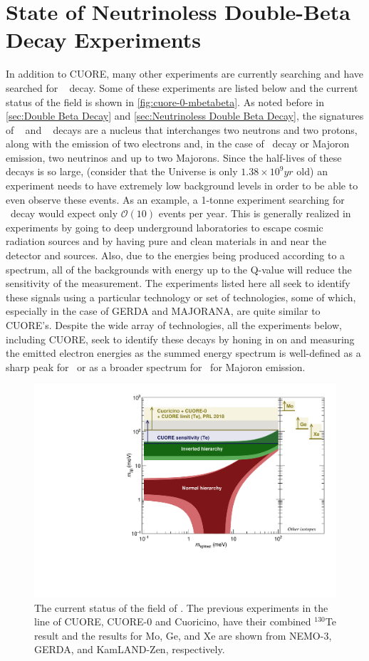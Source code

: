 \section{State of Neutrinoless Double-Beta Decay Experiments}
\label{sec:State of Neutrinoless Double Beta Decay Experiments}
In addition to CUORE, many other experiments are currently searching and have searched for \zeronubb~ decay. Some of these experiments are listed below and the current status of the field is shown in \autoref{fig:cuore-0-mbetabeta}. As noted before in \autoref{sec:Double Beta Decay} and \autoref{sec:Neutrinoless Double Beta Decay}, the signatures of \zeronubb~ and \twonubb~ decays are a nucleus that interchanges two neutrons and two protons, along with the emission of two electrons and, in the case of \twonubb~decay or Majoron emission, two neutrinos and up to two Majorons. Since the half-lives of these decays is so large, (consider that the Universe is only $1.38\times10^{9} yr$ old) an experiment needs to have extremely low background levels in order to be able to even observe these events. As an example, a 1-tonne experiment searching for \zeronubb~decay would expect only $\mathcal{O}(10)$ events per year.  This is generally realized in experiments by going to deep underground laboratories to escape cosmic radiation sources and by having pure and clean materials in and near the detector and sources. Also, due to the energies being produced according to a spectrum, all of the backgrounds with energy up to the Q-value will reduce the sensitivity of the measurement. The experiments listed here all seek to identify these signals using a particular technology or set of technologies, some of which, especially in the case of GERDA and MAJORANA, are quite similar to CUORE's. Despite the wide array of technologies, all the experiments below, including CUORE, seek to identify these decays by honing in on and measuring the emitted electron energies as the summed energy spectrum is well-defined as a sharp peak for \zeronubb~or as a broader spectrum for \twonubb~for Majoron emission.


\begin{figure}[htbp]
\centering
\includegraphics[width=0.7\linewidth]{Figures/M_bb_vs_mlightest_CL_2018.pdf}
\caption{The current status of the field of \zeronubb. The previous experiments in the line of CUORE, CUORE-0 and Cuoricino, have their combined $^{130}$Te result and the results for Mo, Ge, and Xe are shown from NEMO-3, GERDA, and KamLAND-Zen, respectively.}
\label{fig:cuore-0-mbetabeta}
\end{figure}


